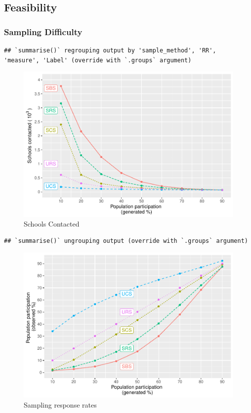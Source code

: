 \documentclass[
  english,
  man,floatsintext]{apa6}
\begin{document}
\hypertarget{feasibility}{%
\subsection{Feasibility}\label{feasibility}}

\hypertarget{sampling-difficulty}{%
\subsubsection{Sampling Difficulty}\label{sampling-difficulty}}

\begin{verbatim}
## `summarise()` regrouping output by 'sample_method', 'RR', 'measure', 'Label' (override with `.groups` argument)
\end{verbatim}

\begin{figure}
\centering
\includegraphics{5---Analysis_files/figure-latex/unnamed-chunk-32-1.pdf}
\caption{\label{fig:unnamed-chunk-32}Schools Contacted}
\end{figure}

\begin{verbatim}
## `summarise()` ungrouping output (override with `.groups` argument)
\end{verbatim}

\begin{figure}
\centering
\includegraphics{5---Analysis_files/figure-latex/unnamed-chunk-33-1.pdf}
\caption{\label{fig:unnamed-chunk-33}Sampling response rates}
\end{figure}
\end{document}
